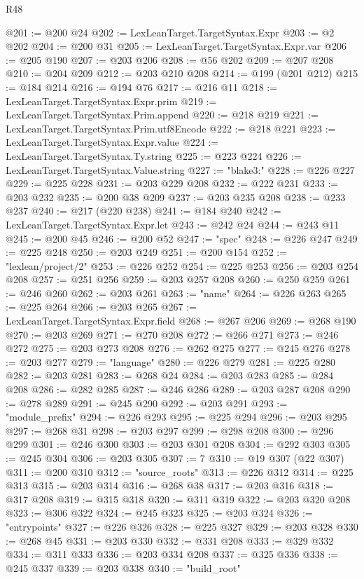 \begin{lexlean}{R48}
\begin{coremodule}
@201 := @200 @24
@202 := LexLeanTarget.TargetSyntax.Expr
@203 := @2 @202
@204 := @200 @31
@205 := LexLeanTarget.TargetSyntax.Expr.var
@206 := @205 @190
@207 := @203 @206
@208 := @56 @202
@209 := @207 @208
@210 := @204 @209
@212 := @203 @210 @208
@214 := @199 (@201 @212)
@215 := @184 @214
@216 := @194 @76
@217 := @216 @11
@218 := LexLeanTarget.TargetSyntax.Expr.prim
@219 := LexLeanTarget.TargetSyntax.Prim.append
@220 := @218 @219
@221 := LexLeanTarget.TargetSyntax.Prim.utf8Encode
@222 := @218 @221
@223 := LexLeanTarget.TargetSyntax.Expr.value
@224 := LexLeanTarget.TargetSyntax.Ty.string
@225 := @223 @224
@226 := LexLeanTarget.TargetSyntax.Value.string
@227 := "blake3:"
@228 := @226 @227
@229 := @225 @228
@231 := @203 @229 @208
@232 := @222 @231
@233 := @203 @232
@235 := @200 @38 @209
@237 := @203 @235 @208
@238 := @233 @237
@240 := @217 (@220 @238)
@241 := @184 @240
@242 := LexLeanTarget.TargetSyntax.Expr.let
@243 := @242 @24
@244 := @243 @11
@245 := @200 @45
@246 := @200 @52
@247 := "spec"
@248 := @226 @247
@249 := @225 @248
@250 := @203 @249
@251 := @200 @154
@252 := "lexlean/project/2"
@253 := @226 @252
@254 := @225 @253
@256 := @203 @254 @208
@257 := @251 @256
@259 := @203 @257 @208
@260 := @250 @259
@261 := @246 @260
@262 := @203 @261
@263 := "name"
@264 := @226 @263
@265 := @225 @264
@266 := @203 @265
@267 := LexLeanTarget.TargetSyntax.Expr.field
@268 := @267 @206
@269 := @268 @190
@270 := @203 @269
@271 := @270 @208
@272 := @266 @271
@273 := @246 @272
@275 := @203 @273 @208
@276 := @262 @275
@277 := @245 @276
@278 := @203 @277
@279 := "language"
@280 := @226 @279
@281 := @225 @280
@282 := @203 @281
@283 := @268 @24
@284 := @203 @283
@285 := @284 @208
@286 := @282 @285
@287 := @246 @286
@289 := @203 @287 @208
@290 := @278 @289
@291 := @245 @290
@292 := @203 @291
@293 := "module_prefix"
@294 := @226 @293
@295 := @225 @294
@296 := @203 @295
@297 := @268 @31
@298 := @203 @297
@299 := @298 @208
@300 := @296 @299
@301 := @246 @300
@303 := @203 @301 @208
@304 := @292 @303
@305 := @245 @304
@306 := @203 @305
@307 := 7
@310 := @19 @307 (@22 @307)
@311 := @200 @310
@312 := "source_roots"
@313 := @226 @312
@314 := @225 @313
@315 := @203 @314
@316 := @268 @38
@317 := @203 @316
@318 := @317 @208
@319 := @315 @318
@320 := @311 @319
@322 := @203 @320 @208
@323 := @306 @322
@324 := @245 @323
@325 := @203 @324
@326 := "entrypoints"
@327 := @226 @326
@328 := @225 @327
@329 := @203 @328
@330 := @268 @45
@331 := @203 @330
@332 := @331 @208
@333 := @329 @332
@334 := @311 @333
@336 := @203 @334 @208
@337 := @325 @336
@338 := @245 @337
@339 := @203 @338
@340 := "build_root"

\end{coremodule}
\end{lexlean}
